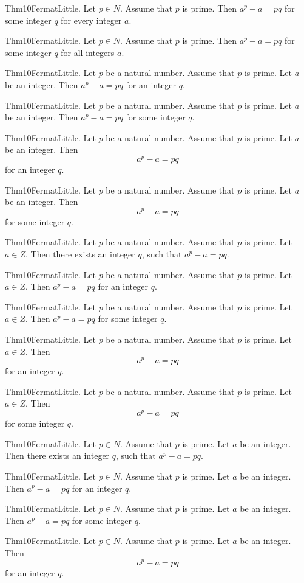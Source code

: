 \documentclass{article}
\begin{document}
Thm10FermatLittle. Let $p \in N$. Assume that $p$ is prime. Then $a ^ {p}- a = p q$ for some integer $q$ for every integer $a$.

Thm10FermatLittle. Let $p \in N$. Assume that $p$ is prime. Then $a ^ {p}- a = p q$ for some integer $q$ for all integers $a$.

Thm10FermatLittle. Let $p$ be a natural number. Assume that $p$ is prime. Let $a$ be an integer. Then $a ^ {p}- a = p q$ for an integer $q$.

Thm10FermatLittle. Let $p$ be a natural number. Assume that $p$ is prime. Let $a$ be an integer. Then $a ^ {p}- a = p q$ for some integer $q$.

Thm10FermatLittle. Let $p$ be a natural number. Assume that $p$ is prime. Let $a$ be an integer. Then $$a ^ {p}- a = p q$$ for an integer $q$.

Thm10FermatLittle. Let $p$ be a natural number. Assume that $p$ is prime. Let $a$ be an integer. Then $$a ^ {p}- a = p q$$ for some integer $q$.

Thm10FermatLittle. Let $p$ be a natural number. Assume that $p$ is prime. Let $a \in Z$. Then there exists an integer $q$, such that $a ^ {p}- a = p q$.

Thm10FermatLittle. Let $p$ be a natural number. Assume that $p$ is prime. Let $a \in Z$. Then $a ^ {p}- a = p q$ for an integer $q$.

Thm10FermatLittle. Let $p$ be a natural number. Assume that $p$ is prime. Let $a \in Z$. Then $a ^ {p}- a = p q$ for some integer $q$.

Thm10FermatLittle. Let $p$ be a natural number. Assume that $p$ is prime. Let $a \in Z$. Then $$a ^ {p}- a = p q$$ for an integer $q$.

Thm10FermatLittle. Let $p$ be a natural number. Assume that $p$ is prime. Let $a \in Z$. Then $$a ^ {p}- a = p q$$ for some integer $q$.

Thm10FermatLittle. Let $p \in N$. Assume that $p$ is prime. Let $a$ be an integer. Then there exists an integer $q$, such that $a ^ {p}- a = p q$.

Thm10FermatLittle. Let $p \in N$. Assume that $p$ is prime. Let $a$ be an integer. Then $a ^ {p}- a = p q$ for an integer $q$.

Thm10FermatLittle. Let $p \in N$. Assume that $p$ is prime. Let $a$ be an integer. Then $a ^ {p}- a = p q$ for some integer $q$.

Thm10FermatLittle. Let $p \in N$. Assume that $p$ is prime. Let $a$ be an integer. Then $$a ^ {p}- a = p q$$ for an integer $q$.
\end{document}
